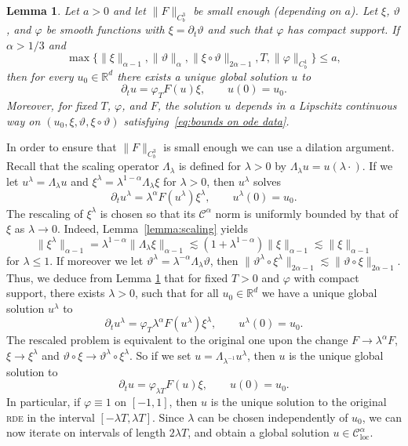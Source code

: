 \documentclass[11pt,a4paper]{article}
\newcommand{\tmop}[1]{\ensuremath{\operatorname{#1}}}
\newtheorem{lemma}[theorem]{Lemma}
\theoremstyle{remark}
\newcommand{\R}{\mathbb{R}}
\newcommand{\CC}{\ensuremath{\mathscr{C}}}
\begin{document}
\begin{lemma}\label{lemma:ode conditional existence uniqueness}
  Let $a>0$ and let $\| F\|_{C^{3}_{b}}$ be small enough (depending on $a$). Let $\xi$, $\vartheta$,
  and $\varphi$ be smooth functions with $\xi = \partial_{t} \vartheta$ and
  such that $\varphi$ has compact support. If $\alpha >1/3$ and
  \begin{equation}\label{eq:bounds on ode data}
     \max \{ \| \xi \|_{\alpha -1} , \| \vartheta \|_{\alpha} , \| \xi \circ \vartheta \|_{2 \alpha -1} ,T, \| \varphi \|_{C^{1}_{b}} \} \leqslant a,
  \end{equation}
  then for every $u_0 \in \R^d$ there exists a unique global solution $u$ to
  \[
     \partial_{t} u= \varphi_{T} F ( u ) \xi, \qquad u(0) = u_0.
  \]
  Moreover, for fixed $T$,
  $\varphi$, and $F$, the solution $u$ depends in a Lipschitz continuous way on $(u_0, \xi, \vartheta , \xi \circ \vartheta)$ satisfying~\eqref{eq:bounds on ode data}.
\end{lemma}

In order to ensure that $\| F \|_{C^{3}_{b}}$ is small enough we can use a
dilation argument. Recall that the scaling operator $\Lambda_\lambda$ is defined for $\lambda > 0$ by $\Lambda_\lambda u = u(\lambda \cdot)$. If we let $u^{\lambda} = \Lambda_{\lambda} u$ and
$\xi^{\lambda} = \lambda^{1- \alpha} \Lambda_{\lambda} \xi$ for $\lambda >0$,
then $u^{\lambda}$ solves
\[
   \partial_{t} u^{\lambda} = \lambda^{\alpha} F ( u^{\lambda} ) \xi^{\lambda}, \qquad u^\lambda(0) = u_0.
\]
The rescaling of $\xi^{\lambda}$ is chosen so that its $\CC^{\alpha}$ norm is
uniformly bounded by that of $\xi$ as $\lambda \rightarrow 0$. Indeed,
Lemma~\ref{lemma:scaling} yields
\[
   \| \xi^{\lambda} \|_{\alpha -1} = \lambda^{1- \alpha} \| \Lambda_{\lambda} \xi \|_{\alpha -1} \lesssim ( 1+ \lambda^{1- \alpha} ) \| \xi \|_{\alpha -1} \lesssim \| \xi \|_{\alpha -1}
\]
for $\lambda \leqslant 1$. If moreover we let $\vartheta^{\lambda} = \lambda^{- \alpha} \Lambda_{\lambda} \vartheta$, then $\| \vartheta^{\lambda} \circ \xi^{\lambda} \|_{2 \alpha -1} \lesssim \| \vartheta \circ   \xi \|_{2 \alpha -1}$. Thus, we deduce from Lemma \ref{lemma:ode conditional existence uniqueness} that for fixed $T>0$ and $\varphi$
with compact support, there exists $\lambda >0$, such that for all $u_{0} \in \mathbb{R}^{d}$ we have a unique
global solution $u^{\lambda}$ to
\[
   \partial_{t} u^{\lambda} = \varphi_{T} \lambda^{\alpha} F ( u^{\lambda} ) \xi^{\lambda}, \qquad u^\lambda(0) = u_0.
\]
The rescaled problem is
equivalent to the original one upon the change $F \rightarrow \lambda^{\alpha} F$, $\xi \rightarrow \xi^{\lambda}$ and $\vartheta \circ   \xi \rightarrow \vartheta^{\lambda} \circ   \xi^{\lambda}$. So if we set $u= \Lambda_{\lambda^{-1}} u^{\lambda}$, then $u$ is the unique global solution to
\[
   \partial_{t} u= \varphi_{\lambda T} F ( u ) \xi, \qquad u(0) = u_0.
\]
In particular, if $\varphi \equiv 1$
on $[ -1,1 ]$, then $u$ is the unique solution to the original \textsc{rde} in the
interval $[ - \lambda T, \lambda T ]$.
Since $\lambda$ can be chosen independently of $u_{0}$, we can now iterate on
intervals of length $2\lambda T$, and obtain a global solution $u \in \CC^{\alpha}_{\tmop{loc}}$.
\end{document}
